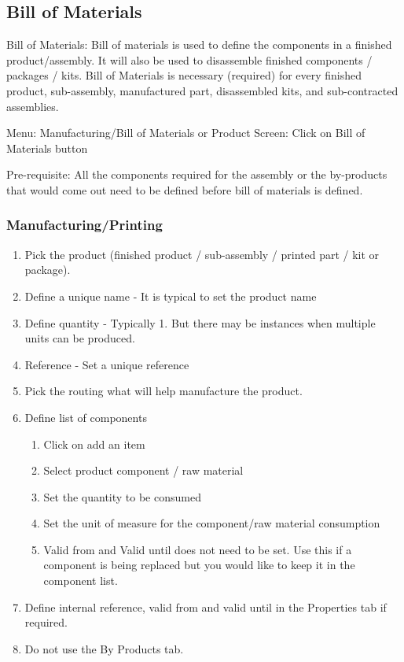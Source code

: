 \subsection{Bill of Materials}
Bill of Materials: Bill of materials is used to define the components in a finished product/assembly. It will also be used to disassemble finished components / packages / kits. Bill of Materials is necessary (required) for every finished product, sub-assembly, manufactured part, disassembled kits, and sub-contracted assemblies. 

Menu: Manufacturing/Bill of Materials or 
Product Screen: Click on Bill of Materials button

Pre-requisite: All the components required for the assembly or the by-products that would come out need to be defined before bill of materials is defined.

\subsubsection{Manufacturing/Printing}
\begin{enumerate}
\item Pick the product (finished product / sub-assembly / printed part / kit or package).
\item Define a unique name - It is typical to set the product name
\item Define quantity - Typically 1. But there may be instances when multiple units can be produced.
\item Reference - Set a unique reference
\item Pick the routing what will help manufacture the product.
\item Define list of components
  \begin{enumerate}
  \item Click on add an item
  \item Select product component / raw material
  \item Set the quantity to be consumed
  \item Set the unit of measure for the component/raw material consumption
  \item Valid from and Valid until does not need to be set. Use this if a component is being replaced but you would like to keep it in the component list.
  \end{enumerate}
\item Define internal reference, valid from and valid until in the Properties tab if required.
\item Do not use the By Products tab.
\end{enumerate}


